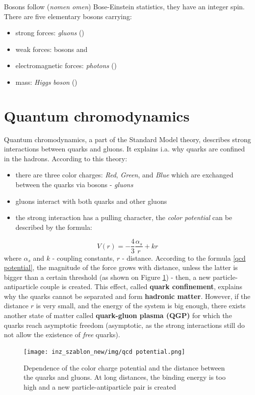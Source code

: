    
Bosons follow (\emph{nomen omen}) Bose-Einstein statistics, they have an integer spin. There are five elementary bosons carrying: 
\begin{itemize}
    \item strong forces: \emph{gluons} (\Pg)
    \item weak forces: bosons \PWpm and \PZz
    \item electromagnetic forces: \emph{photons} (\Pgg)
    \item mass: \emph{Higgs boson} (\PH) 
\end{itemize}

\section{Quantum chromodynamics}
Quantum chromodynamics, a part of the Standard Model theory, describes strong interactions between quarks and gluons. It explains i.a. why quarks are confined in the hadrons\cite{zbroszczyk}. According to this theory:
\begin{itemize}
    \item there are three color charges: \emph{Red}, \emph{Green}, and \emph{Blue} which are exchanged between the quarks via bosons - \emph{gluons}
    \item gluons interact with both quarks and other gluons
    \item the strong interaction has a pulling character, the \emph{color potential} can be described by the formula:
\end{itemize}
\begin{equation} \label{qcd potential}
    V (r) = - \frac{4}{3} \frac{\alpha_s}{r} + kr 
\end{equation}
where $\alpha_s$ and $k$ - coupling constants, $r$ - distance.
According to the formula \ref{qcd potential}, the magnitude of the force grows with distance, unless the latter is bigger than a certain threshold (as shown on Figure \ref{qcd graph}) - then, a new particle-antiparticle couple is created. This effect, called \textbf{quark confinement}, explains why the quarks cannot be separated and form \textbf{hadronic matter}. However, if the distance $r$ is very small, and the energy of the system is big enough, there exists another state of matter called \textbf{quark-gluon plasma (QGP)} for which the quarks reach asymptotic freedom (asymptotic, as the strong interactions still do not allow the existence of \emph{free} quarks).
\begin{figure}[H]
    \centering
    \texttt{[image: inz\_szablon\_new/img/qcd potential.png]}
    \caption{Dependence of the color charge potential and the distance between the quarks and gluons. At long distances, the binding energy is too high and a new particle-antiparticle pair is created \cite{grebieszkow}}
    \label{qcd graph}
 \end{figure}
